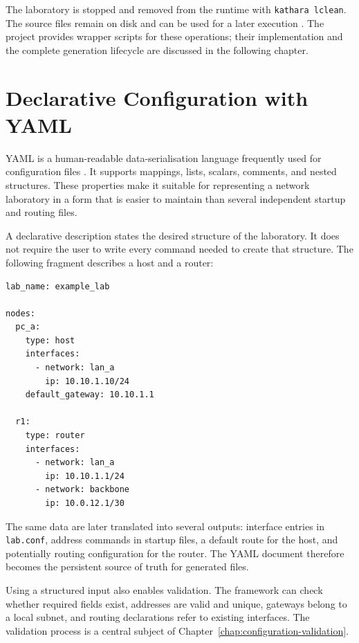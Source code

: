 The laboratory is stopped and removed from the runtime with
\texttt{kathara lclean}. The source files remain on disk and can be used for a
later execution \cite{kathara_manpage}. The project provides wrapper scripts for these operations;
their implementation and the complete generation lifecycle are discussed in
the following chapter.

\section{Declarative Configuration with YAML}
\label{sec:yaml-background}

YAML is a human-readable data-serialisation language frequently used for
configuration files \cite{yaml122}. It supports mappings, lists,
scalars, comments, and nested structures. These properties make it suitable
for representing a network laboratory in a form that is easier to maintain
than several independent startup and routing files.

A declarative description states the desired structure of the laboratory. It
does not require the user to write every command needed to create that
structure. The following fragment describes a host and a router:

\begin{lstlisting}[caption={Simplified YAML topology declaration.},label={lst:yaml-background-example}]
lab_name: example_lab

nodes:
  pc_a:
    type: host
    interfaces:
      - network: lan_a
        ip: 10.10.1.10/24
    default_gateway: 10.10.1.1

  r1:
    type: router
    interfaces:
      - network: lan_a
        ip: 10.10.1.1/24
      - network: backbone
        ip: 10.0.12.1/30
\end{lstlisting}

The same data are later translated into several outputs: interface entries in
\texttt{lab.conf}, address commands in startup files, a default route for the
host, and potentially routing configuration for the router. The YAML document
therefore becomes the persistent source of truth for generated files.

Using a structured input also enables validation. The framework can check
whether required fields exist, addresses are valid and unique, gateways belong
to a local subnet, and routing declarations refer to existing interfaces. The
validation process is a central subject of Chapter~\ref{chap:configuration-validation}.

